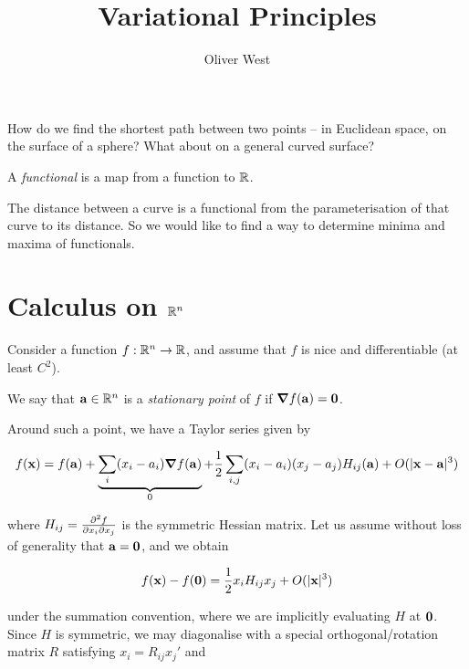 \documentclass{../../template/note}
\author{Oliver West}
\title{Variational Principles}
\date{}
\begin{document}
    \maketitle

    \tableofcontents


    How do we find the shortest path between two points -- in Euclidean space, on the surface of a sphere? What about on a general curved surface?

    \begin{definition}[Functionals]
        A \emph{functional} is a map from a function to $\mathbb R$.
    \end{definition}
    
    The distance between a curve is a functional from the parameterisation of that curve to its distance. So we would like to find a way to determine minima and maxima of functionals.

    \section{Calculus on $\mathbb R^n$}

    Consider a function $f: \mathbb R^n \to \mathbb R$, and assume that $f$ is nice and differentiable (at least $C^2$).

    \begin{definition}
        We say that $\V a \in \RR^n$ is a \emph{stationary point} of $f$ if $\grad f(\V a) = \V 0$.
    \end{definition}
    
    Around such a point, we have a Taylor series given by

    \begin{align*}
        f(\V x) = f(\V a) + \underbrace{\sum_i (x_i-a_i) \grad f(\V a)}_{0} + \frac 1 2 \sum_{i, j} (x_i-a_i)(x_j-a_j) H_{ij}(\V a) + O(|\V x-\V a|^3)
    \end{align*}
    
    where $H_{ij} = \pd{^2f}{x_i \pr x_j}$ is the symmetric Hessian matrix. Let us assume without loss of generality that $\V a = \V 0$, and we obtain
    
    \begin{align*}
        f(\V x) - f(\V 0) = \frac 1 2 x_i H_{ij} x_j + O(|\V x|^3)
    \end{align*}
    
    under the summation convention, where we are implicitly evaluating $H$ at $\V 0$. Since $H$ is symmetric, we may diagonalise with a special orthogonal/rotation matrix $R$ satisfying $x_i = R_{ij} x_j'$ and
\end{document}
